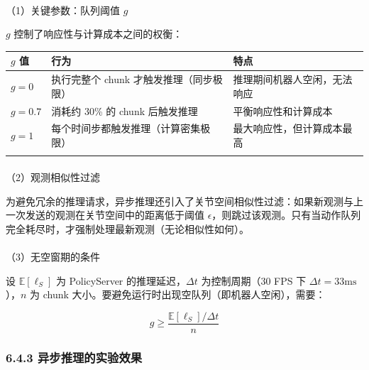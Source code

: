 \documentclass[
  chinese,
]{ctexart}
\makeatletter
\let\oldparagraph\paragraph
\renewcommand{\paragraph}{
    \@ifstar
      \xxxParagraphStar
      \xxxParagraphNoStar
  }
\newcommand{\xxxParagraphStar}[1]{\oldparagraph*{#1}\mbox{}}
\newcommand{\xxxParagraphNoStar}[1]{\oldparagraph{#1}\mbox{}}
\makeatother
\begin{document}
\paragraph{\texorpdfstring{（1）关键参数：队列阈值
\(g\)}{（1）关键参数：队列阈值 g}}\label{ux5173ux952eux53c2ux6570ux961fux5217ux9608ux503c-g}

\(g\) 控制了响应性与计算成本之间的权衡：

\begin{center}
\begin{tabular}{@{}>{\raggedright\arraybackslash}p{} >{\raggedright\arraybackslash}p{} >{\raggedright\arraybackslash}p{}@{}}
\toprule\noalign{}
\(g\) 值 & 行为 & 特点 \\
\midrule\noalign{}
\(g = 0\) & 执行完整个 chunk 才触发推理（同步极限） & 推理期间机器人空闲，无法响应 \\
\(g = 0.7\) & 消耗约 30\% 的 chunk 后触发推理 & 平衡响应性和计算成本 \\
\(g = 1\) & 每个时间步都触发推理（计算密集极限） & 最大响应性，但计算成本最高 \\
\bottomrule\noalign{}
\end{tabular}
\end{center}

\paragraph{（2）观测相似性过滤}\label{ux89c2ux6d4bux76f8ux4f3cux6027ux8fc7ux6ee4}

为避免冗余的推理请求，异步推理还引入了关节空间相似性过滤：如果新观测与上一次发送的观测在关节空间中的距离低于阈值
\(\epsilon\)，则跳过该观测。只有当动作队列完全耗尽时，才强制处理最新观测（无论相似性如何）。

\paragraph{（3）无空窗期的条件}\label{ux65e0ux7a7aux7a97ux671fux7684ux6761ux4ef6}

设 \(\mathbb{E}[\ell_S]\) 为 PolicyServer 的推理延迟，\(\Delta t\)
为控制周期（30 FPS 下 \(\Delta t = 33\text{ms}\)），\(n\) 为 chunk
大小。要避免运行时出现空队列（即机器人空闲），需要：

\[
g \geq \frac{\mathbb{E}[\ell_S] / \Delta t}{n}
\]

\subsubsection{6.4.3
异步推理的实验效果}\label{ux5f02ux6b65ux63a8ux7406ux7684ux5b9eux9a8cux6548ux679c}
\end{document}
